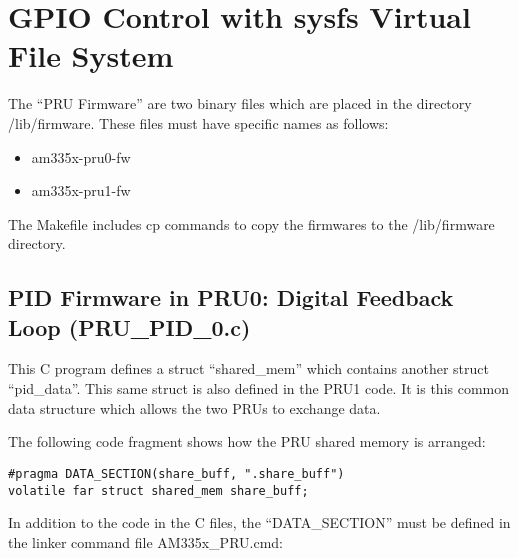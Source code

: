 %
%
%

\chapter{GPIO Control with sysfs Virtual File System}

The ``PRU Firmware'' are two binary files which are placed in the directory /lib/firmware.
These files must have specific names as follows:

\begin{itemize}
	\item am335x-pru0-fw
	\item am335x-pru1-fw
\end{itemize}

The Makefile includes cp commands to copy the firmwares to the /lib/firmware directory.

\section{PID Firmware in PRU0:  Digital Feedback Loop (PRU\_PID\_0.c)}

This C program defines a struct ``shared\_mem'' which contains another struct ``pid\_data''. This same struct is also defined in the PRU1 code.  It is this common data structure which allows the two PRUs to exchange data.

The following code fragment shows how the PRU shared memory is arranged:

\begin{verbatim}
#pragma DATA_SECTION(share_buff, ".share_buff")
volatile far struct shared_mem share_buff;
\end{verbatim}

In addition to the code in the C files, the ``DATA\_SECTION'' must be defined in the linker command file AM335x\_PRU.cmd:

